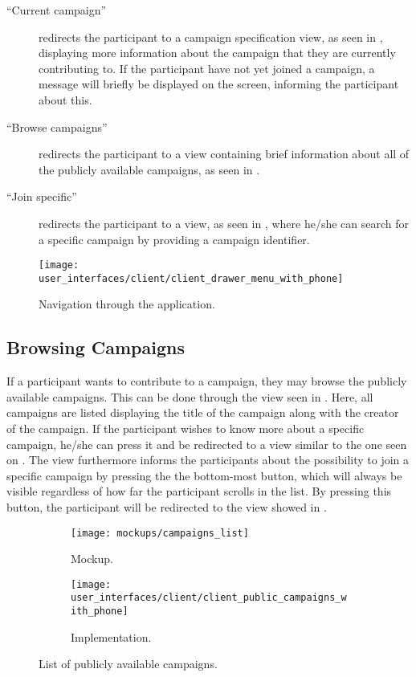 \begin{description}
	\item[``Current campaign''] redirects the participant to a campaign specification view, as seen in , displaying more information about the campaign that they are currently contributing to. If the participant have not yet joined a campaign, a message will briefly be displayed on the screen, informing the participant about this.

	\item[``Browse campaigns''] redirects the participant to a view containing brief information about all of the publicly available campaigns, as seen in .

	\item[``Join specific''] redirects the participant to a view, as seen in , where he/she can search for a specific campaign by providing a campaign identifier.
\end{description}

\begin{figure}[!htbp]
\centering
\texttt{[image: user\_interfaces/client/client\_drawer\_menu\_with\_phone]}
\caption{Navigation through the application.}
\label{fig:navigation}
\end{figure}
\FloatBarrier

\subsection{Browsing Campaigns}
If a participant wants to contribute to a campaign, they may browse the publicly available campaigns. This can be done through the view seen in . Here, all campaigns are listed displaying the title of the campaign along with the creator of the campaign. If the participant wishes to know more about a specific campaign, he/she can press it and be redirected to a view similar to the one seen on . The view furthermore informs the participants about the possibility to join a specific campaign by pressing the the bottom-most button, which will always be visible regardless of how far the participant scrolls in the list. By pressing this button, the participant will be redirected to the view showed in .

\begin{figure}[!htbp]
\begin{subfigure}[!t]{.48\textwidth}
  \centering
  \texttt{[image: mockups/campaigns\_list]}
  \caption{Mockup.}
  \label{fig:mockup_public_campaigns}
\end{subfigure}%
\begin{subfigure}[!t]{.52\textwidth}
  \centering
  \texttt{[image: user\_interfaces/client/client\_public\_campaigns\_with\_phone]}
  \caption{Implementation.}
  \label{fig:implementation_public_campaigns}
\end{subfigure}
\caption{List of publicly available campaigns.}
\label{fig:public_campaigns}
\end{figure}
\FloatBarrier

